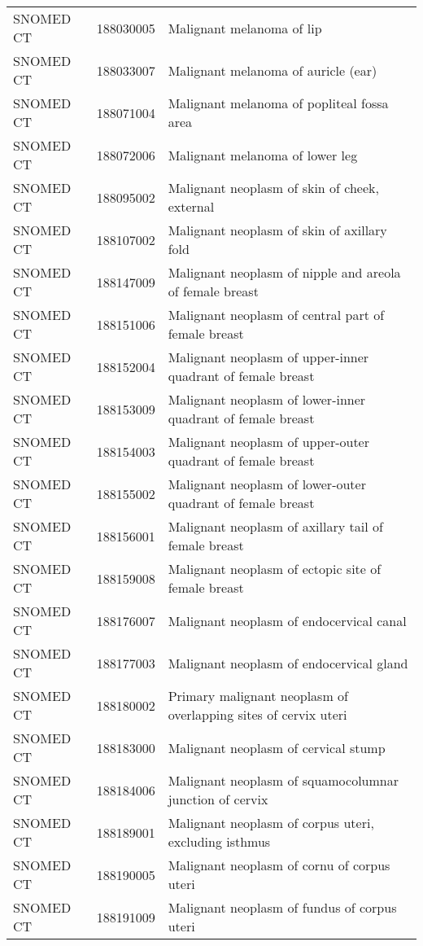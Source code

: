 \begin{longtable}{p{}p{}p{}}
  SNOMED CT & 188030005 & Malignant melanoma of lip \\ 
  SNOMED CT & 188033007 & Malignant melanoma of auricle (ear) \\ 
  SNOMED CT & 188071004 & Malignant melanoma of popliteal fossa area \\ 
  SNOMED CT & 188072006 & Malignant melanoma of lower leg \\ 
  SNOMED CT & 188095002 & Malignant neoplasm of skin of cheek, external \\ 
  SNOMED CT & 188107002 & Malignant neoplasm of skin of axillary fold \\ 
  SNOMED CT & 188147009 & Malignant neoplasm of nipple and areola of female breast \\ 
  SNOMED CT & 188151006 & Malignant neoplasm of central part of female breast \\ 
  SNOMED CT & 188152004 & Malignant neoplasm of upper-inner quadrant of female breast \\ 
  SNOMED CT & 188153009 & Malignant neoplasm of lower-inner quadrant of female breast \\ 
  SNOMED CT & 188154003 & Malignant neoplasm of upper-outer quadrant of female breast \\ 
  SNOMED CT & 188155002 & Malignant neoplasm of lower-outer quadrant of female breast \\ 
  SNOMED CT & 188156001 & Malignant neoplasm of axillary tail of female breast \\ 
  SNOMED CT & 188159008 & Malignant neoplasm of ectopic site of female breast \\ 
  SNOMED CT & 188176007 & Malignant neoplasm of endocervical canal \\ 
  SNOMED CT & 188177003 & Malignant neoplasm of endocervical gland \\ 
  SNOMED CT & 188180002 & Primary malignant neoplasm of overlapping sites of cervix uteri \\ 
  SNOMED CT & 188183000 & Malignant neoplasm of cervical stump \\ 
  SNOMED CT & 188184006 & Malignant neoplasm of squamocolumnar junction of cervix \\ 
  SNOMED CT & 188189001 & Malignant neoplasm of corpus uteri, excluding isthmus \\ 
  SNOMED CT & 188190005 & Malignant neoplasm of cornu of corpus uteri \\ 
  SNOMED CT & 188191009 & Malignant neoplasm of fundus of corpus uteri \\ 

\end{longtable}
